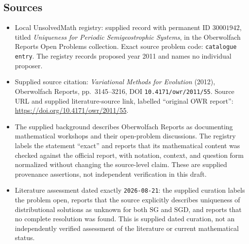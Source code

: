\documentclass[11pt]{article}
\begin{document}
\subsection{Sources}
\begin{itemize}
\item Local UnsolvedMath registry: supplied record with permanent ID \(30001942\), titled \emph{Uniqueness for Periodic Semigeostrophic Systems}, in the Oberwolfach Reports Open Problems collection. Exact source problem code: \texttt{catalogue entry}. The registry records proposed year 2011 and names no individual proposer.
\item Supplied source citation: \emph{Variational Methods for Evolution} (2012), Oberwolfach Reports, pp.\ 3145--3216, DOI \texttt{10.4171/owr/2011/55}. Source URL and supplied literature-source link, labelled ``original OWR report'': \url{https://doi.org/10.4171/owr/2011/55}.
\item The supplied background describes Oberwolfach Reports as documenting mathematical workshops and their open-problem discussions. The registry labels the statement ``exact'' and reports that its mathematical content was checked against the official report, with notation, context, and question form normalized without changing the source-level claim. These are supplied provenance assertions, not independent verification in this draft.
\item Literature assessment dated exactly \texttt{2026-08-21}: the supplied curation labels the problem open, reports that the source explicitly describes uniqueness of distributional solutions as unknown for both \(\mathrm{SG}\) and \(\mathrm{SGD}\), and reports that no complete resolution was found. This is supplied dated curation, not an independently verified assessment of the literature or current mathematical status.
\end{itemize}
\end{document}
